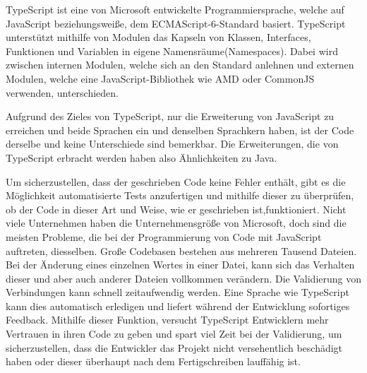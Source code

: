 
TypeScript ist eine von Microsoft entwickelte Programmiersprache, welche auf JavaScript beziehungsweiße, dem ECMAScript-6-Standard basiert. TypeScript unterstützt mithilfe von Modulen das Kapseln von Klassen, Interfaces, Funktionen und Variablen in eigene Namensräume(Namespaces). Dabei wird zwischen internen Modulen, welche sich an den Standard anlehnen und externen Modulen, welche eine JavaScript-Bibliothek wie AMD oder CommonJS verwenden, unterschieden. \cite{TypeScript}



Aufgrund des Zieles von TypeScript, nur die Erweiterung von JavaScript zu erreichen und beide Sprachen ein und denselben Sprachkern haben, ist der Code derselbe und keine Unterschiede sind bemerkbar. Die Erweiterungen, die von TypeScript erbracht werden haben also Ähnlichkeiten zu Java. \cite{TypeScript}


Um sicherzustellen, dass der geschrieben Code keine Fehler enthält, gibt es die Möglichkeit automatisierte Tests anzufertigen und mithilfe dieser zu überprüfen, ob der Code in dieser Art und Weise, wie er geschrieben ist,funktioniert.
Nicht viele Unternehmen haben die Unternehmensgröße von Microsoft, doch sind die meisten Probleme, die bei der Programmierung von Code mit JavaScript auftreten, diesselben. Große Codebasen bestehen aus mehreren Tausend Dateien. Bei der Änderung eines einzelnen Wertes in einer Datei, kann sich das Verhalten dieser und aber auch anderer Dateien vollkommen verändern.
Die Validierung von Verbindungen kann schnell zeitaufwendig werden. Eine Sprache wie TypeScript kann dies automatisch erledigen und liefert während der Entwicklung sofortiges Feedback. Mithilfe dieser Funktion, versucht TypeScript Entwicklern mehr Vertrauen in ihren Code zu geben und spart viel Zeit bei der Validierung, um sicherzustellen, dass die Entwickler das Projekt nicht versehentlich beschädigt haben oder dieser überhaupt nach dem Fertigschreiben lauffähig ist. \cite{ScriptWiki}
